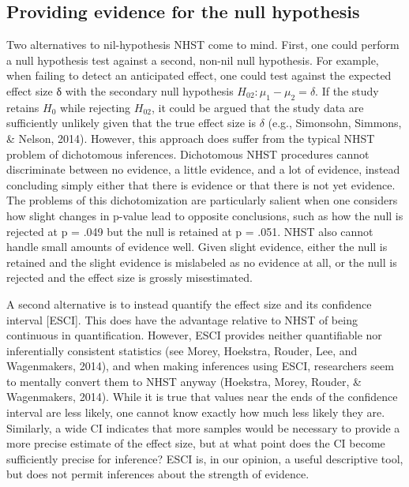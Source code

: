 \documentclass[fignum,nobf,man]{apa}
\begin{document}
\subsection{Providing evidence for the null hypothesis}
Two alternatives to nil-hypothesis NHST come to mind. First, one could perform a null hypothesis test against a second, non-nil null hypothesis. For example, when failing to detect an anticipated effect, one could test against the expected effect size δ with the secondary null hypothesis $H_{02}: \mu_1 - \mu_2 = \delta$. If the study retains $H_0$ while rejecting $H_{02}$, it could be argued that the study data are sufficiently unlikely given that the true effect size is $\delta$ (e.g., Simonsohn, Simmons, \& Nelson, 2014). However, this approach does suffer from the typical NHST problem of dichotomous inferences. Dichotomous NHST procedures cannot discriminate between no evidence, a little evidence, and a lot of evidence, instead concluding simply either that there is evidence or that there is not yet evidence. The problems of this dichotomization are particularly salient when one considers how slight changes in p-value lead to opposite conclusions, such as how the null is rejected at p = .049 but the null is retained at p = .051. NHST also cannot handle small amounts of evidence well. Given slight evidence, either the null is retained and the slight evidence is mislabeled as no evidence at all, or the null is rejected and the effect size is grossly misestimated. 

A second alternative is to instead quantify the effect size and its confidence interval [ESCI]. This does have the advantage relative to NHST of being continuous in quantification.  However, ESCI provides neither quantifiable nor inferentially consistent statistics (see Morey, Hoekstra, Rouder, Lee, and Wagenmakers, 2014), and when making inferences using ESCI, researchers seem to mentally convert them to NHST anyway (Hoekstra, Morey, Rouder, \& Wagenmakers, 2014). While it is true that values near the ends of the confidence interval are less likely, one cannot know exactly how much less likely they are. Similarly, a wide CI indicates that more samples would be necessary to provide a more precise estimate of the effect size, but at what point does the CI become sufficiently precise for inference? ESCI is, in our opinion, a useful descriptive tool, but does not permit inferences about the strength of evidence.
\end{document}
